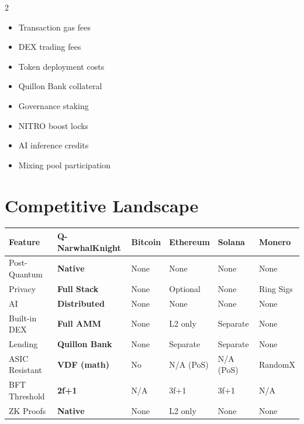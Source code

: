 \documentclass[11pt,a4paper]{article}
\begin{document}
\begin{multicols}{2}
\begin{itemize}[leftmargin=1.5em]
    \item Transaction gas fees
    \item DEX trading fees
    \item Token deployment costs
    \item Quillon Bank collateral
    \item Governance staking
    \item NITRO boost locks
    \item AI inference credits
    \item Mixing pool participation
\end{itemize}
\end{multicols}


\section{Competitive Landscape}

\begin{center}
\small
\begin{tabular}{@{}p{2.8cm}p{2.5cm}p{1.8cm}p{1.8cm}p{1.8cm}p{1.8cm}@{}}
\toprule
\textbf{Feature} & \textbf{Q-NarwhalKnight} & \textbf{Bitcoin} & \textbf{Ethereum} & \textbf{Solana} & \textbf{Monero} \\
\midrule
Post-Quantum & \textcolor{qnkgreen}{\textbf{Native}} & \textcolor{qnkred}{None} & \textcolor{qnkred}{None} & \textcolor{qnkred}{None} & \textcolor{qnkred}{None} \\
Privacy & \textcolor{qnkgreen}{\textbf{Full Stack}} & \textcolor{qnkred}{None} & \textcolor{qnkamber}{Optional} & \textcolor{qnkred}{None} & \textcolor{qnkgreen}{Ring Sigs} \\
AI & \textcolor{qnkgreen}{\textbf{Distributed}} & \textcolor{qnkred}{None} & \textcolor{qnkred}{None} & \textcolor{qnkred}{None} & \textcolor{qnkred}{None} \\
Built-in DEX & \textcolor{qnkgreen}{\textbf{Full AMM}} & \textcolor{qnkred}{None} & \textcolor{qnkamber}{L2 only} & \textcolor{qnkamber}{Separate} & \textcolor{qnkred}{None} \\
Lending & \textcolor{qnkgreen}{\textbf{Quillon Bank}} & \textcolor{qnkred}{None} & \textcolor{qnkamber}{Separate} & \textcolor{qnkamber}{Separate} & \textcolor{qnkred}{None} \\
ASIC Resistant & \textcolor{qnkgreen}{\textbf{VDF (math)}} & \textcolor{qnkred}{No} & N/A (PoS) & N/A (PoS) & \textcolor{qnkgreen}{RandomX} \\
BFT Threshold & \textcolor{qnkgreen}{\textbf{2f+1}} & N/A & 3f+1 & 3f+1 & N/A \\
ZK Proofs & \textcolor{qnkgreen}{\textbf{Native}} & \textcolor{qnkred}{None} & \textcolor{qnkamber}{L2 only} & \textcolor{qnkred}{None} & \textcolor{qnkred}{None} \\
\bottomrule
\end{tabular}
\end{center}
\end{document}
